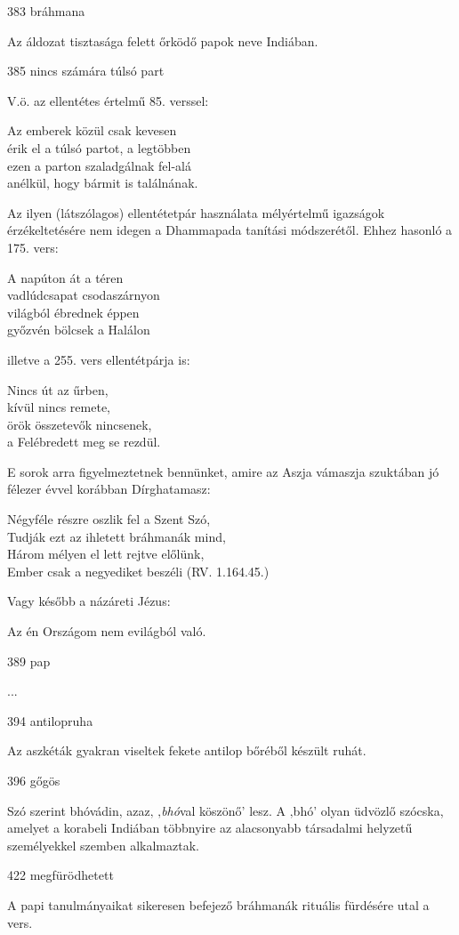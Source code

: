 
\begin{notesdescription}

\item[{383}
{bráhmana}
{}] \hfill\par

Az áldozat tisztasága felett őrködő papok neve Indiában.

\item[{385}
{nincs számára túlsó part}
{}]

V.ö. az ellentétes értelmű 85. verssel:

Az emberek közül csak kevesen\\
érik el a túlsó partot, a legtöbben\\
ezen a parton szaladgálnak fel-alá\\
anélkül, hogy bármit is találnának.

Az ilyen (látszólagos) ellentétetpár használata mélyértelmű igazságok érzékeltetésére nem idegen a Dhammapada tanítási módszerétől. Ehhez hasonló a 175. vers:

A napúton át a téren\\
vadlúdcsapat csodaszárnyon\\
világból ébrednek éppen\\
győzvén bölcsek a Halálon

illetve a 255. vers ellentétpárja is:

Nincs út az űrben,\\
kívül nincs remete,\\
örök összetevők nincsenek,\\
a Felébredett meg se rezdül.

E sorok arra figyelmeztetnek bennünket, amire az Aszja vámaszja szuktában jó félezer évvel korábban Dírghatamasz:

Négyféle részre oszlik fel a Szent Szó,\\
Tudják ezt az ihletett bráhmanák mind,\\
Három mélyen el lett rejtve előlünk,\\
Ember csak a negyediket beszéli (RV. 1.164.45.)

Vagy később a názáreti Jézus:

Az én Országom nem evilágból való.

\item[{389}
{pap}
{}]

...

\item[{394}
{antilopruha}
{}]

Az aszkéták gyakran viseltek fekete antilop bőréből készült ruhát.

\item[{396}
{gőgös}
{}]

Szó szerint bhóvádin, azaz‚ ‚\textit{bhó}val köszönő’ lesz. A ‚bhó’ olyan üdvözlő szócska, amelyet a korabeli Indiában többnyire az alacsonyabb társadalmi helyzetű személyekkel szemben alkalmaztak.

\item[{422}
{megfürödhetett}
{}]

A papi tanulmányaikat sikeresen befejező bráhmanák rituális fürdésére utal a vers.

\end{notesdescription}

